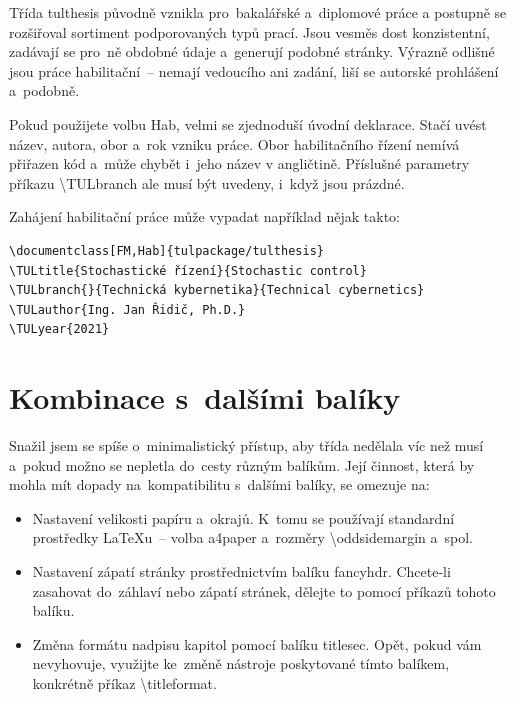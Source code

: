 \documentclass[a4paper,11pt,fonts,numbering,twoside,margins,listingsleft]{./tulpackage/tulthesis}
\makeatletter
\newcommand{\argument}[1]{{\ttfamily\color{\tulcolor}#1}}
\newcommand{\argumentindex}[1]{\argument{#1}\index{#1}}
\newcommand{\prikazneindex}[1]{\argument{\textbackslash{}#1}}
\newcommand{\prikaz}[1]{\prikazneindex{#1}\index{#1@\textbackslash #1}}
\makeatother
\begin{document}
Třída \argument{tulthesis} původně vznikla pro~bakalářské a~diplomové práce a
postupně se rozšiřoval sortiment podporovaných typů prací. Jsou vesměs dost
konzistentní, zadávají se pro~ně obdobné údaje a~generují podobné stránky.
Výrazně odlišné jsou práce habilitační~-- nemají vedoucího ani zadání, liší se
autorské prohlášení a~podobně.

Pokud použijete volbu \argumentindex{Hab}, velmi se zjednoduší úvodní
deklarace. Stačí uvést název, autora, obor a~rok vzniku práce. Obor
habilitačního řízení nemívá přiřazen kód a~může chybět i~jeho název v
angličtině. Příslušné parametry příkazu \prikaz{TULbranch} ale musí být
uvedeny, i~když jsou prázdné.

Zahájení habilitační práce může vypadat například nějak takto:

\begin{slisting}
\begin{verbatim}
\documentclass[FM,Hab]{tulpackage/tulthesis}
\TULtitle{Stochastické řízení}{Stochastic control}
\TULbranch{}{Technická kybernetika}{Technical cybernetics}
\TULauthor{Ing. Jan Řidič, Ph.D.}
\TULyear{2021}
\end{verbatim}
\end{slisting}

\section{Kombinace s~dalšími balíky}

Snažil jsem se spíše o~minimalistický přístup, aby třída nedělala víc než musí
a~pokud možno se nepletla do~cesty různým balíkům. Její činnost, která by
mohla mít dopady na~kompatibilitu s~dalšími balíky, se omezuje na:

\begin{itemize}
    \item Nastavení velikosti papíru a~okrajů. K~tomu se používají standardní
          prostředky \LaTeX{}u~-- volba \argument{a4paper} a~rozměry
          \prikazneindex{oddsidemargin} a~spol.

    \item Nastavení zápatí stránky prostřednictvím balíku \argument{fancyhdr}.
          Chcete-li zasahovat do~záhlaví nebo zápatí stránek, dělejte to pomocí příkazů
          tohoto balíku.

    \item Změna formátu nadpisu kapitol pomocí balíku \argument{titlesec}. Opět,
          pokud vám nevyhovuje, využijte ke~změně nástroje poskytované tímto balíkem,
          konkrétně příkaz \prikazneindex{titleformat}.

\end{itemize}
\end{document}
